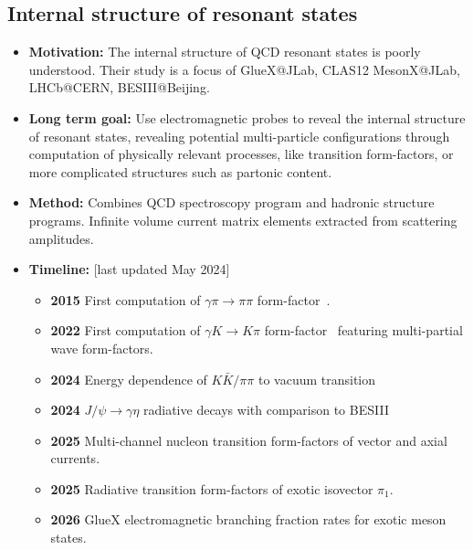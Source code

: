 \documentclass[12pt,hyperpdf]{article}
\begin{document}
\subsection{Internal structure of resonant states}
\begin{itemize}
    \item{\bf Motivation:} The internal structure of QCD resonant states
      is poorly understood. Their study is a focus of GlueX@JLab,
      CLAS12 MesonX@JLab, LHCb@CERN, BESIII@Beijing. 
    \item{\bf Long term goal:} Use electromagnetic probes to reveal the internal structure of resonant
      states, revealing potential multi-particle
      configurations through computation of physically relevant
      processes, like transition form-factors, or more complicated
      structures such as partonic content.
    \item{\bf Method:} Combines QCD spectroscopy program and hadronic
      structure programs. Infinite volume current matrix elements
      extracted from scattering amplitudes.
\item{\bf Timeline:} \hfill [last updated May 2024]
\begin{itemize}
    \item{\bf 2015} First computation of $\gamma\pi\rightarrow\pi\pi$ form-factor~\cite{Briceno:2015dca}. 
    \item{\bf 2022} First computation of $\gamma K\rightarrow K\pi$
      form-factor~\cite{Radhakrishnan:2022ubg} featuring multi-partial
      wave form-factors.
    \item{\bf 2024} Energy dependence of $K\bar{K}/\pi\pi$ to vacuum transition
    \item{\bf 2024} $J/\psi\rightarrow\gamma\eta$ radiative decays with  comparison to BESIII
    \item{\bf 2025} Multi-channel nucleon transition form-factors of vector and axial currents.
    \item{\bf 2025} Radiative transition form-factors of exotic isovector $\pi_1$.
    \item{\bf 2026} GlueX electromagnetic branching fraction rates for exotic meson states.
\end{itemize}
\end{itemize}

\end{document}
